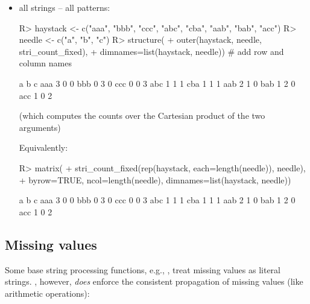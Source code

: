 \documentclass[nojss]{jss}
\begin{document}
\begin{itemize}
\item all strings -- all patterns:


\begin{Schunk}
\begin{Sinput}
R> haystack <- c("aaa", "bbb", "ccc", "abc", "cba", "aab", "bab", "acc")
R> needle <- c("a", "b", "c")
R> structure(
+    outer(haystack, needle, stri_count_fixed),
+    dimnames=list(haystack, needle))  # add row and column names
\end{Sinput}
\begin{Soutput}
    a b c
aaa 3 0 0
bbb 0 3 0
ccc 0 0 3
abc 1 1 1
cba 1 1 1
aab 2 1 0
bab 1 2 0
acc 1 0 2
\end{Soutput}
\end{Schunk}

(which computes the counts over the Cartesian product
of the two arguments)

\ifnotJSSversion
Equivalently:

\begin{Schunk}
\begin{Sinput}
R> matrix(
+    stri_count_fixed(rep(haystack, each=length(needle)), needle),
+    byrow=TRUE, ncol=length(needle), dimnames=list(haystack, needle))
\end{Sinput}
\begin{Soutput}
    a b c
aaa 3 0 0
bbb 0 3 0
ccc 0 0 3
abc 1 1 1
cba 1 1 1
aab 2 1 0
bab 1 2 0
acc 1 0 2
\end{Soutput}
\end{Schunk}
\fi

\end{itemize}






\subsection{Missing values}

Some base  string processing functions,
e.g., , treat missing values as literal 
strings.
, however, \textit{does} enforce the consistent
propagation of missing values (like arithmetic operations):
\end{document}

